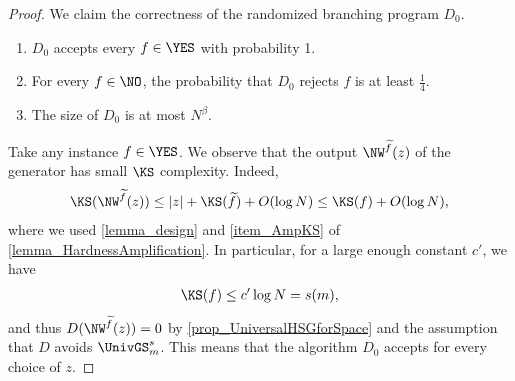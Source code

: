 \documentclass{toc}
\begin{document}
\begin{proof}
  We claim the correctness of the randomized branching program $D_0$.
  \begin{claim}
    \label{claim_RandomizedROBP}
    \hspace{0em}
    \begin{enumerate}
      \item
            $D_0$ accepts every $f \in \YES$ with probability 1.
      \item
            For every $f \in \NO$,
            the probability that $D_0$ rejects $f$ is at least $\frac{1}{4}$.
      \item
            The size of $D_0$ is at most $N^{\beta}$.
    \end{enumerate}
  \end{claim}
  Take any \Yes instance $f \in \YES$.
  We observe that the output $\NW^{\widetilde{f}}(z)$ of the generator has small $\KS$ complexity.
  Indeed,
  \begin{align*}
    \KS(\NW^{{\widetilde{f}}}(z)) \le |z| + \KS({\widetilde{f}}) + O(\log N) \le \KS(f) + O(\log N),
  \end{align*}
  where we used \cref{lemma_design} and \cref{item_AmpKS} of \cref{lemma_HardnessAmplification}.
  In particular, for a large enough constant $c'$, we have
  \begin{align*}
    \KS(f) \le c' \log N = s(m),
  \end{align*}
  and thus $D(\NW^{\widetilde{f}}(z)) = 0$ by \cref{prop_UniversalHSGforSpace} and the assumption that $D$ avoids $\UnivGS_m^s$.
  This means that the algorithm $D_0$ accepts for every choice of $z$.


\end{proof}
\end{document}
